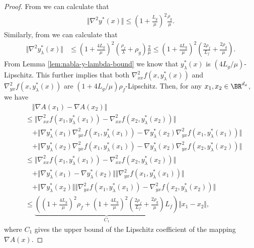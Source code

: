 \begin{proof}
From  we can calculate that 
\begin{align} \label{bound:nabla2-yx}
    \Vert \nabla^2 y^*(x) \Vert \le \left( 1 + \frac{L_g}{\mu} \right)^2 \frac{\rho_g}{\mu}  .
\end{align}
Similarly, from  we can calculate that
\begin{align} \label{bound:nabla2-y-lambda}
    \Vert \nabla^2 y_{\lambda}^*(x)  \Vert &\le \left( 1 + \frac{4L_g}{\mu} \right)^2 \left( \frac{\rho_f}{\lambda}+ \rho_g \right) \frac{2}{\mu} \le \left( 1 + \frac{4L_g}{\mu} \right)^2 \left( \frac{2\rho_f}{L_f} + \frac{2 \rho_g}{\mu} \right). 
\end{align}
From Lemma \ref{lem:nabla-y-lambda-bound} we know that $y_{\lambda}^*(x)$ is $(4L_g/\mu)$-Lipschitz. This further implies that both $ \nabla_{xx}^2 f(x,y_{\lambda}^*(x))$ and $\nabla_{yx}^2 f(x,y_{\lambda}^*(x)) $ are $(1+ 4L_g/ \mu)\rho_f$-Lipschitz. Then, for any $x_1,x_2 \in \BR^{d_x}$, we have
\begin{align*}
    &\quad  \Vert \nabla A(x_1) - \nabla A(x_2) \Vert \\
   &\le \Vert  \nabla_{xx}^2 f(x_1,y_{\lambda}^*(x_1)) - \nabla_{xx}^2 f(x_2, y_{\lambda}^*(x_2)) \Vert  \\
   &\quad + \Vert \nabla y_{\lambda}^*(x_1) \nabla_{yx}^2 f(x_1,y_{\lambda}^*(x_1)) - \nabla y_{\lambda}^*(x_2) \nabla_{yx}^2 f(x_1,y_{\lambda}^*(x_1)) \Vert \\
   &\quad + \Vert \nabla y_{\lambda}^*(x_2) \nabla_{yx}^2 f(x_1,y_{\lambda}^*(x_1)) - \nabla y_{\lambda}^*(x_2) \nabla_{yx}^2 f(x_2,y_{\lambda}^*(x_2)) \Vert \\
   &\le \Vert \nabla_{xx}^2 f(x_1,y_{\lambda}^*(x_1)) - \nabla_{xx}^2 f(x_2, y_{\lambda}^*(x_2)) \Vert  \\
   &\quad + \Vert \nabla y_{\lambda}^*(x_1) - \nabla y_{\lambda}^*(x_2) \Vert \Vert \nabla_{yx}^2 f(x_1,y_{\lambda}^*(x_1)) \Vert \\
   &\quad + \Vert \nabla y_{\lambda}^*(x_2) \Vert \Vert \nabla_{yx}^2 f(x_1,y_{\lambda}^*(x_1)) - \nabla_{yx}^2 f(x_2,y_{\lambda}^*(x_2)) \Vert \\
   &\le \underbrace{\left(\left( 1+ \frac{4L_g}{\mu} \right)^2 \rho_f + \left( 1 + \frac{4L_g}{\mu} \right)^2 \left( \frac{2\rho_f}{L_f} + \frac{2 \rho_g}{\mu} \right) L_f \right)}_{C_1}\Vert x_1-x_2 \Vert,
\end{align*}
where $C_1$ gives the upper bound of the Lipschitz coefficient of the mapping $\nabla A(x)$.


\end{proof}
